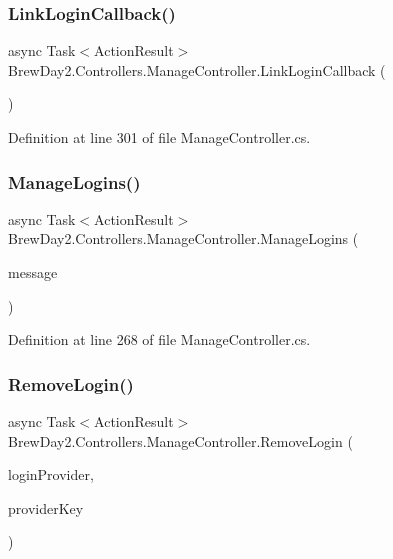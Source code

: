 \subsubsection{\texorpdfstring{Link\+Login\+Callback()}{LinkLoginCallback()}}
{\footnotesize\ttfamily async Task$<$Action\+Result$>$ Brew\+Day2.\+Controllers.\+Manage\+Controller.\+Link\+Login\+Callback (\begin{DoxyParamCaption}{ }\end{DoxyParamCaption})}



Definition at line 301 of file Manage\+Controller.\+cs.

\mbox{\label{class_brew_day2_1_1_controllers_1_1_manage_controller_a59a0289809aed504c5bc5163896e70a2}} 
\subsubsection{\texorpdfstring{Manage\+Logins()}{ManageLogins()}}
{\footnotesize\ttfamily async Task$<$Action\+Result$>$ Brew\+Day2.\+Controllers.\+Manage\+Controller.\+Manage\+Logins (\begin{DoxyParamCaption}\item[{\mbox{\hyperlink{class_brew_day2_1_1_controllers_1_1_manage_controller_a418038dc90e9d94606f474b9c06fd8c8}{Manage\+Message\+Id}}?}]{message }\end{DoxyParamCaption})}



Definition at line 268 of file Manage\+Controller.\+cs.

\mbox{\label{class_brew_day2_1_1_controllers_1_1_manage_controller_abfb50c4f1b23ee3a2808e104712680cb}} 
\subsubsection{\texorpdfstring{Remove\+Login()}{RemoveLogin()}}
{\footnotesize\ttfamily async Task$<$Action\+Result$>$ Brew\+Day2.\+Controllers.\+Manage\+Controller.\+Remove\+Login (\begin{DoxyParamCaption}\item[{string}]{login\+Provider,  }\item[{string}]{provider\+Key }\end{DoxyParamCaption})}



